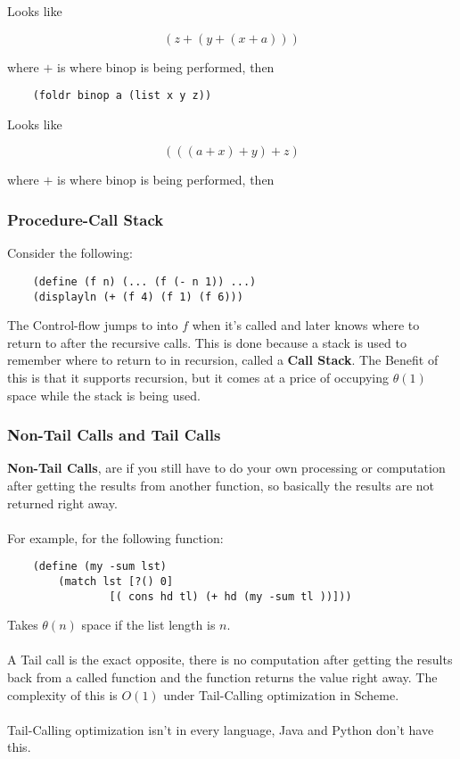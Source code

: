 \documentclass[12pt]{article}
\begin{document}
Looks like

$$(z + (y + (x+a)))$$

where $+$ is where binop is being performed, then

\begin{lstlisting}
	(foldr binop a (list x y z))
\end{lstlisting}

Looks like

$$(((a + x) + y) + z)$$

where $+$ is where binop is being performed, then

\subsubsection{Procedure-Call Stack}

Consider the following:

\begin{lstlisting}
	(define (f n) (... (f (- n 1)) ...)
	(displayln (+ (f 4) (f 1) (f 6)))
\end{lstlisting}

The Control-flow jumps to into $f$ when it's called and later knows where to return to after the recursive calls. This is done because a stack is used to remember where to return to in recursion, called a \textbf{Call Stack}. The Benefit of this is that it supports recursion, but it comes at a price of occupying $\theta (1)$ space while the stack is being used.

\subsubsection{Non-Tail Calls and Tail Calls}

\textbf{Non-Tail Calls}, are if you still have to do your own processing or computation after getting the results from another function, so basically the results are not returned right away.
\\
\\
For example, for the following function:

\begin{lstlisting}
	(define (my -sum lst)
		(match lst [?() 0]
				[( cons hd tl) (+ hd (my -sum tl ))]))
\end{lstlisting}

Takes $\theta (n)$ space if the list length is $n$.\\
\\
A Tail call is the exact opposite, there is no computation after getting the results back from a called function and the function returns the value right away. The complexity of this is $O(1)$ under Tail-Calling optimization in Scheme.\\
\\
Tail-Calling optimization isn't in every language, Java and Python don't have this.
\end{document}
